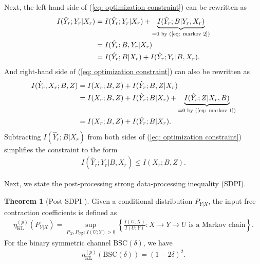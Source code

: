 \documentclass[12pt]{article}
\theoremstyle{definition}
\newtheorem{theorem}{Theorem}
\newcommand{\KL}{\mathrm{KL}}
\begin{document}
Next, the left-hand side of (\ref{eq: optimization constraint}) can be rewritten as 
\begin{align*}
    I(\hat{Y}_r; Y_r | X_r) & =I(\hat{Y}_r ; Y_r | X_r) + \underbrace{I(\hat{Y}_r; B|Y_r , X_r)}_{=0 \text{ by (\ref{eq: markov 2})}} \\
    & = I(\hat{Y}_r; B, Y_r | X_r) \\
    & = I(\hat{Y}_r ; B | X_r) + I(\hat{Y}_r ; Y_r | B, X_r).
\end{align*}
And right-hand side of (\ref{eq: optimization constraint}) can also be rewritten as 
\begin{align*}
    I(\hat{Y}_r, X_r; B, Z) & = I(X_r; B, Z) + I(\hat{Y}_r; B, Z | X_r) \\
    & = I(X_r; B, Z) + I(\hat{Y}_r; B | X_r) + \underbrace{I(\hat{Y}_r; Z|X_r, B)}_{=0 \text{ by (\ref{eq: markov 1})}} \\
    & = I(X_r; B, Z) + I(\hat{Y}_r; B | X_r).
\end{align*}
Subtracting $I(\hat{Y}_r; B | X_r)$ from both sides of (\ref{eq: optimization constraint}) simplifies the constraint to the form
\begin{align}
    I(\hat{Y}_r; Y_r | B, X_r) \leq I(X_r; B, Z). \label{eq: new constraint}
\end{align}

Next, we state the post-processing strong data-processing inequality (SDPI).
\begin{theorem}[Post-SDPI \cite{pol25}] \label{thm: SDPI}
    Given a conditional distribution $P_{Y|X}$, the input-free contraction coefficients is defined as 
    \begin{align*}
        \eta_{\KL}^{(p)}(P_{Y|X}) = \sup_{P_X, P_{U|Y}: I(U;Y) > 0} \left\{ \frac{I(U;X)}{I(U;Y)} : X \to Y \to U \text{ is a Markov chain}\right\}.
    \end{align*}
    For the binary symmetric channel $\mathrm{BSC}(\delta)$, we have
    \begin{align*}
        \eta_{\KL}^{(p)}(\mathrm{BSC}(\delta)) = (1 - 2\delta)^2.
    \end{align*}
\end{theorem}
\end{document}

